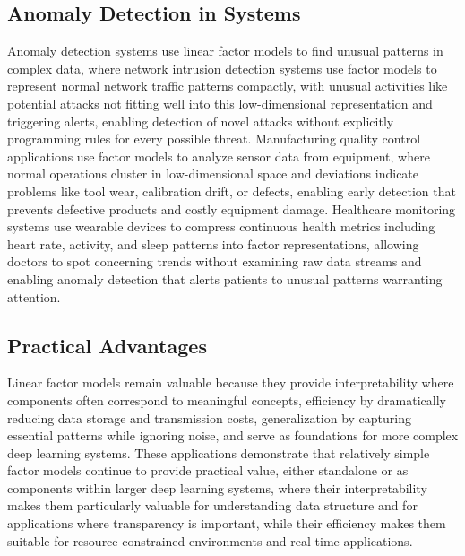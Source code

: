 \subsection{Anomaly Detection in Systems}

Anomaly detection systems use linear factor models to find unusual patterns in complex data, where network intrusion detection systems use factor models to represent normal network traffic patterns compactly, with unusual activities like potential attacks not fitting well into this low-dimensional representation and triggering alerts, enabling detection of novel attacks without explicitly programming rules for every possible threat. Manufacturing quality control applications use factor models to analyze sensor data from equipment, where normal operations cluster in low-dimensional space and deviations indicate problems like tool wear, calibration drift, or defects, enabling early detection that prevents defective products and costly equipment damage. Healthcare monitoring systems use wearable devices to compress continuous health metrics including heart rate, activity, and sleep patterns into factor representations, allowing doctors to spot concerning trends without examining raw data streams and enabling anomaly detection that alerts patients to unusual patterns warranting attention.

\subsection{Practical Advantages}

Linear factor models remain valuable because they provide interpretability where components often correspond to meaningful concepts, efficiency by dramatically reducing data storage and transmission costs, generalization by capturing essential patterns while ignoring noise, and serve as foundations for more complex deep learning systems. These applications demonstrate that relatively simple factor models continue to provide practical value, either standalone or as components within larger deep learning systems, where their interpretability makes them particularly valuable for understanding data structure and for applications where transparency is important, while their efficiency makes them suitable for resource-constrained environments and real-time applications.

